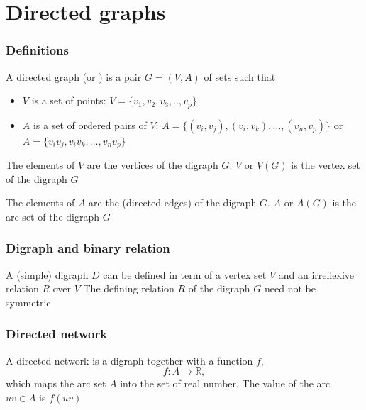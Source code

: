 \documentclass[aspectratio=169]{beamer}\usepackage[]{graphicx}\usepackage[]{xcolor}
\begin{document}
	


\section{Directed graphs}


\begin{frame} \frametitle{Definitions} 
\begin{definition}[{Digraph}]
A directed graph (or ) is a pair $G=(V,A)$ of sets such that
\begin{itemize}
\item $V$ is a set of points:  $V=\{v_1,v_2,v_3,..,v_p\}$
\item $A$ is a set of ordered pairs of $V$: $A=\{(v_i,v_j),(v_i,v_k),\dots,(v_n,v_p)\}$ or $A=\{v_iv_j,v_iv_k,\dots,v_nv_p\}$
\end{itemize}
\end{definition}
\begin{definition}[{Vertex}]
The elements of $V$ are the vertices of the digraph $G$.
$V$ or $V(G)$ is the vertex set of the digraph $G$
\end{definition}
\begin{definition}[{Arc}]
The elements of $A$ are the  (directed edges) of the digraph $G$.
$A$ or $A(G)$ is the arc set of the digraph $G$
\end{definition}
\end{frame}



\begin{frame}\frametitle{Digraph and binary relation}
A (simple) digraph $D$ can be defined in term of a vertex set $V$ and an irreflexive relation $R$ over $V$
\vfill
The defining relation $R$ of the digraph $G$ need not be symmetric
\end{frame}


\begin{frame}\frametitle{Directed network}
\begin{definition}
A directed network is a digraph together with a function $f$,
\[
f: A \rightarrow \mathbb{R},
\]
which maps the arc set $A$ into the set of real number. 
The value of the arc $uv \in A$ is $f(uv)$
\end{definition}
\end{frame}
\end{document}
